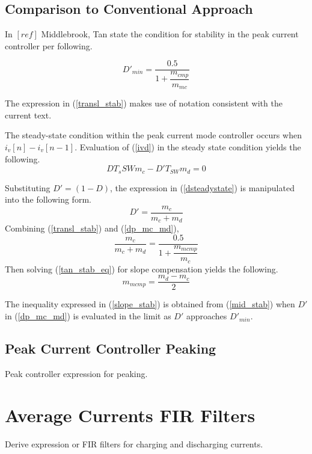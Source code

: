 \documentclass[conference]{IEEEtran}
\begin{document}
\subsection{Comparison to Conventional Approach}
In $[ref]$ Middlebrook, Tan state the condition for stability in the peak current controller per following.

\begin{equation}
D'_{min} = \dfrac{0.5}{1 + \dfrac{m_{cmp}}{m_{mc}}} \label{transl_stab}
\end{equation}

The expression in (\ref{transl_stab}) makes use of notation consistent with the current text.

The steady-state condition within the peak current mode controller occurs when $i_v[n] - i_v[n-1]$. Evaluation of (\ref{ivd}) in the steady state condition yields the following.
\begin{equation}
	D T_s{SW} m_c - D' T_{SW} m_d = 0 \label{dsteadystate}
\end{equation}

Substituting $D' = (1-D)$, the expression in (\ref{dsteadystate}) is manipulated into the following form.
\begin{equation}
	D' = \dfrac{m_c}{m_c+m_d} \label{dp_mc_md}
\end{equation}
Combining (\ref{transl_stab}) and (\ref{dp_mc_md}),
\begin{equation}
	\dfrac{m_c}{m_c + m_d} = \dfrac{0.5}{1 + \dfrac{m_{mcmp}}{m_c}} \label{tan_stab_eq}
\end{equation}
Then solving (\ref{tan_stab_eq}) for slope compensation yields the following.
\begin{equation}
	m_{mcmp} = \dfrac{m_d - m_c}{2} \label{mid_stab}
\end{equation}

The inequality expressed in (\ref{slope_stab}) is obtained from (\ref{mid_stab}) when $D'$ in (\ref{dp_mc_md}) is evaluated in the limit as $D'$ approaches $D'_{min}$.

\subsection{Peak Current Controller Peaking}
Peak controller expression for peaking.

\section{Average Currents FIR Filters}
Derive expression or FIR filters for charging and discharging currents.
\end{document}
